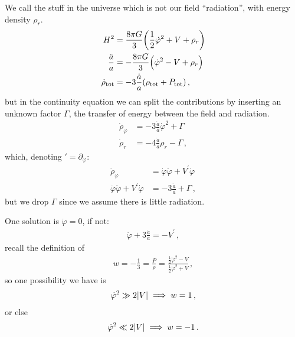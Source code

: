 \documentclass[main.tex]{subfiles}
\begin{document}
We call the stuff in the universe which is not our field ``radiation'', with energy density \(\rho_r\). 
%
\begin{subequations}    
\begin{align}
    H^2 &= \frac{8 \pi G }{3} \qty(\frac{1}{2} \dot{\varphi }^2 + V + \rho_r) \\
    \frac{\ddot{a}}{a} &= - \frac{8 \pi G }{3} \qty(\dot{\varphi }^2 - V + \rho_r) \\
    \dot{\rho} _{\text{tot}} &= - 3 \frac{\dot{a}}{a} \qty(\rho _{\text{tot}} + P _{\text{tot}})
    \,,
\end{align}
\end{subequations}
%
but in the continuity equation we can split the contributions by inserting an unknown factor \(\Gamma \), the transfer of energy between the field and radiation. 
%
\begin{subequations}
\begin{align}
  \dot{\rho} _\varphi &=  - 3 \frac{\dot{a}}{a} \dot{\varphi }^2 + \Gamma \\  
  \dot{\rho} _r &=  - 4 \frac{\dot{a}}{a} \rho_r - \Gamma  
\,,
\end{align}
\end{subequations}
%
which, denoting \(' = \partial_\varphi \): 
%
\begin{subequations}
\begin{align}
  \dot{\rho }_\varphi &= \dot{\varphi } \ddot{\varphi } + V^{\prime } \dot{\varphi } \\
  \ddot{\varphi} \dot{\varphi } + V^{\prime } \dot{\varphi } &= -3 \frac{\dot{a}}{a} + \Gamma 
\,,
\end{align}
\end{subequations}
%
but we drop \(\Gamma \) since we assume there is little radiation.

One solution is \(\dot{\varphi } =0\), if not: 
%
\begin{align}
  \ddot{\varphi } + 3 \frac{\dot{a}}{a} = - V^{\prime }
\,,
\end{align}
%
recall the definition of
%
\begin{align}
  w = - \frac{1}{3} = \frac{P}{\rho }
  = \frac{\frac{1}{2} \dot{\varphi }^2 - V}{\frac{1}{2} \dot{\varphi }^2 + V}
\,,
\end{align}
%
so one possibility we have is 
%
\begin{align}
  \dot{\varphi }^2 \gg 2 \abs{V} \implies w = 1
\,,
\end{align}
%
or else 
%
\begin{align}
\dot{\varphi }^2 \ll 2 \abs{V} \implies w = - 1
\,.
\end{align}
\end{document}
